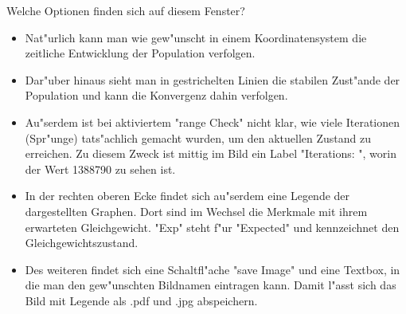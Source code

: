\documentclass[11pt, a4paper, german]{article}
\theoremstyle{plain}
\begin{document}
	Welche Optionen finden sich auf diesem Fenster?\\
	\begin{itemize}
		\item Nat"urlich kann man wie gew"unscht in einem Koordinatensystem die zeitliche Entwicklung der Population verfolgen.
		\item Dar"uber hinaus sieht man in gestrichelten Linien die stabilen Zust"ande der Population und kann die Konvergenz dahin verfolgen.
		\item Au"serdem ist bei aktiviertem "{}range Check"{} nicht klar, wie viele Iterationen (Spr"unge) tats"achlich gemacht wurden, um den aktuellen Zustand zu erreichen. Zu diesem Zweck ist mittig im Bild ein Label "{}Iterations: "{}, worin der Wert 1388790 zu sehen ist.
		\item In der rechten oberen Ecke findet sich au"serdem eine Legende der dargestellten Graphen. Dort sind im Wechsel die Merkmale mit ihrem erwarteten Gleichgewicht. "{}Exp"{} steht f"ur "{}Expected"{} und kennzeichnet den Gleichgewichtszustand.
		\item Des weiteren findet sich eine Schaltfl"ache "{}save Image"{} und eine Textbox, in die man den gew"unschten Bildnamen eintragen kann. Damit l"asst sich das Bild mit Legende als .pdf und .jpg abspeichern.
	\end{itemize}
\end{document}
